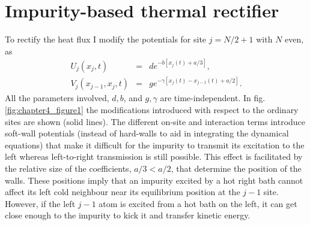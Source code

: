 \section{Impurity-based thermal rectifier \label{sec:Impurity_rectifier}}

To rectify the heat flux I modify the potentials for site $j=N/2+1$ with $N$ even, as
%
%
\begin{eqnarray}
\label{IMP}
U_j(x_j,t)&=&d e^{-b [x_j(t)+a/3]},
\\
V_j(x_{j-1},x_j,t)&=&ge^{-\gamma [x_j(t)-x_{j-1}(t)+a/2]}.
\end{eqnarray}
%
All the parameters involved, $d, b$, and $g,\gamma$ are time-independent. In fig. \ref{fig:chapter4_figure1} the modifications introduced with respect to the ordinary sites are shown (solid lines).  The different on-site and interaction terms introduce soft-wall potentials
(instead of hard-walls to aid in integrating the dynamical equations) that make it difficult for the impurity to transmit its excitation to the left whereas left-to-right transmission is still possible.
This effect is facilitated by the relative size of the coefficients, $a/3<a/2$, that determine the position of the walls.
These positions imply that an impurity excited by a hot right bath cannot affect its left cold neighbour near its equilibrium position at the $j-1$ site.
However, if the left $j-1$ atom is excited from a hot bath on the left,
it can get close enough to the impurity to kick it and transfer kinetic energy.

